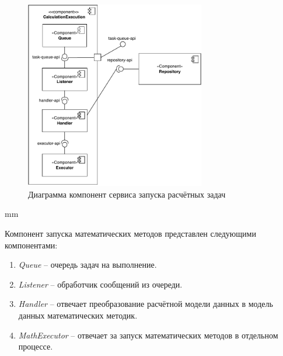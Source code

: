 \begin{figure}[H]
	\hspace*{-2.5 cm}\includegraphics[width=0.7\textwidth]{architecture/pictures/orchestrator/calculation_component}
	\caption{Диаграмма компонент сервиса запуска расчётных задач}
	\label{pic:architecture__orchestrator-task-execution-component}
\end{figure}
 mm

Компонент запуска математических методов представлен следующими компонентами:
\begin{enumerate}
	\item {
		\textit{Queue} -- очередь задач на выполнение.
	}
	\item {
		\textit{Listener} -- обработчик сообщений из очереди.
	}
	\item {
		\textit{Handler} -- отвечает преобразование расчётной модели данных в модель данных математических методик.
	}
	\item {
		\textit{MathExecutor} -- отвечает за запуск математических методов в отдельном процессе.
	}
\end{enumerate}
